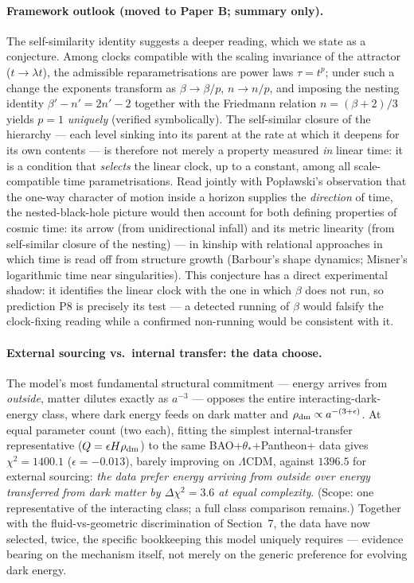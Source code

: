 \documentclass[11pt]{article}
\begin{document}
\paragraph{Framework outlook (moved to Paper B; summary only).} The self-similarity identity suggests a deeper reading, which we state as a conjecture. Among clocks compatible with the scaling invariance of the attractor ($t \to \lambda t$), the admissible reparametrisations are power laws $\tau = t^{p}$; under such a change the exponents transform as $\beta \to \beta/p$, $n \to n/p$, and imposing the nesting identity $\beta' - n' = 2n' - 2$ together with the Friedmann relation $n = (\beta+2)/3$ yields $p = 1$ \emph{uniquely} (verified symbolically). The self-similar closure of the hierarchy --- each level sinking into its parent at the rate at which it deepens for its own contents --- is therefore not merely a property measured \emph{in} linear time: it is a condition that \emph{selects} the linear clock, up to a constant, among all scale-compatible time parametrisations. Read jointly with Popławski's observation that the one-way character of motion inside a horizon supplies the \emph{direction} of time, the nested-black-hole picture would then account for both defining properties of cosmic time: its arrow (from unidirectional infall) and its metric linearity (from self-similar closure of the nesting) --- in kinship with relational approaches in which time is read off from structure growth (Barbour's shape dynamics; Misner's logarithmic time near singularities). This conjecture has a direct experimental shadow: it identifies the linear clock with the one in which $\beta$ does not run, so prediction P8 is precisely its test --- a detected running of $\beta$ would falsify the clock-fixing reading while a confirmed non-running would be consistent with it.

\paragraph{External sourcing vs.\ internal transfer: the data choose.} The model's most fundamental structural commitment --- energy arrives from \emph{outside}, matter dilutes exactly as $a^{-3}$ --- opposes the entire interacting-dark-energy class, where dark energy feeds on dark matter and $\rho_{\rm dm} \propto a^{-(3+\epsilon)}$. At equal parameter count (two each), fitting the simplest internal-transfer representative ($Q = \epsilon H \rho_{\rm dm}$) to the same BAO+$\theta_*$+Pantheon+ data gives $\chi^2 = 1400.1$ ($\epsilon = -0.013$), barely improving on $\Lambda$CDM, against $1396.5$ for external sourcing: \emph{the data prefer energy arriving from outside over energy transferred from dark matter by $\Delta\chi^2 = 3.6$ at equal complexity}. (Scope: one representative of the interacting class; a full class comparison remains.) Together with the fluid-vs-geometric discrimination of Section~7, the data have now selected, twice, the specific bookkeeping this model uniquely requires --- evidence bearing on the mechanism itself, not merely on the generic preference for evolving dark energy.
\end{document}
